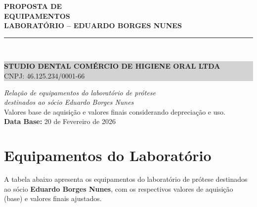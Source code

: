\documentclass[12pt, a4paper]{article}
\begin{document}
\begin{titlepage}
    \centering
    \vspace*{3cm}
    {\Huge \textbf{\textcolor{primaryColor}{PROPOSTA DE}}} \\
    \vspace{0.5cm}
    {\Huge \textbf{\textcolor{primaryColor}{EQUIPAMENTOS}}} \\
    \vspace{0.5cm}
    {\Large \textbf{LABORATÓRIO -- EDUARDO BORGES NUNES}} \\
    \vspace{2cm}
    \rule{10cm}{1.5pt} \\
    \vspace{0.5cm}
    \colorbox{lightGray}{%
        \parbox{0.9\textwidth}{%
            \centering
            \vspace{0.3cm}
            {\Large \textbf{STUDIO DENTAL COMÉRCIO DE HIGIENE ORAL LTDA}} \\
            \vspace{0.3cm}
            {\large CNPJ: 46.125.234/0001-66} \\
            \vspace{0.3cm}
        }%
    }
    \vspace{3cm}

    {\Large \textit{Relação de equipamentos do laboratório de prótese}} \\
    \vspace{0.3cm}
    {\Large \textit{destinados ao sócio Eduardo Borges Nunes}} \\

    \vfill
    {\small Valores base de aquisição e valores finais considerando depreciação e uso.} \\
    \vspace{1cm}
    \textbf{Data Base:} 20 de Fevereiro de 2026
\end{titlepage}

\section{Equipamentos do Laboratório}

A tabela abaixo apresenta os equipamentos do laboratório de prótese destinados ao sócio \textbf{Eduardo Borges Nunes}, com os respectivos valores de aquisição (base) e valores finais ajustados.
\end{document}
